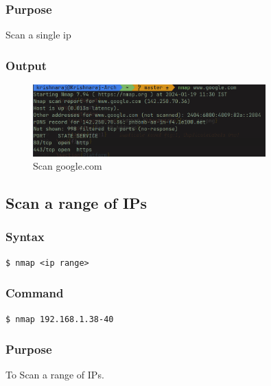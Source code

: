 \documentclass[11pt]{article}
\begin{document}
\subsubsection*{Purpose}
Scan a single ip

\subsubsection*{Output}
\begin{figure}[H]
    \centering
    \includegraphics[width=0.8\textwidth]{nmap google.png}
    \caption{Scan google.com}
    \label{fig:1}
\end{figure}

\subsection{Scan a range of IPs}

\subsubsection{Syntax}
\begin{verbatim}
$ nmap <ip range>
\end{verbatim}

\subsubsection*{Command}
\begin{verbatim}
$ nmap 192.168.1.38-40
\end{verbatim}

\subsubsection*{Purpose}
To Scan a range of IPs.
\end{document}
